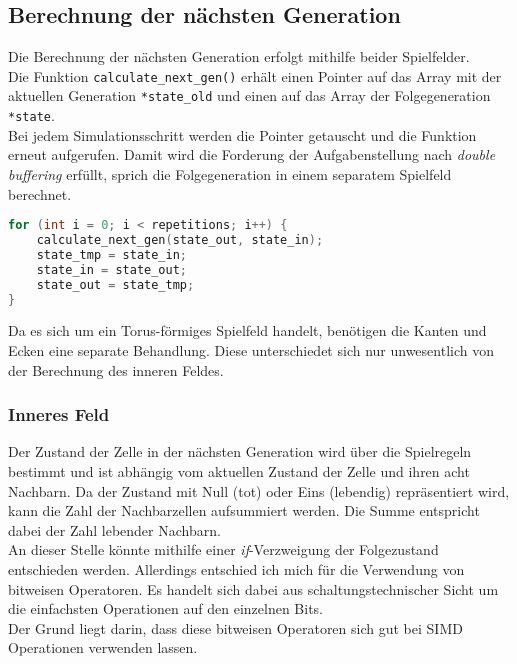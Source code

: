 \documentclass[german,plainarticle,hyperref,utf8]{zihpub}
\begin{document}
	\subsection{Berechnung der nächsten Generation}
	Die Berechnung der nächsten Generation erfolgt mithilfe beider Spielfelder.\\ Die Funktion \texttt{calculate\_next\_gen()} erhält einen Pointer auf das Array mit der aktuellen Generation \texttt{*state\_old} und einen auf das Array der Folgegeneration \texttt{*state}.\\
	Bei jedem Simulationsschritt werden die Pointer getauscht und die Funktion erneut aufgerufen. Damit wird die Forderung der Aufgabenstellung nach \textit{double buffering} erfüllt, sprich die Folgegeneration in einem separatem Spielfeld berechnet.
	\begin{lstlisting}[language=C, caption=Vertauschen der Pointer vor jedem Funktionsaufruf (vereinfacht)]
for (int i = 0; i < repetitions; i++) {
	calculate_next_gen(state_out, state_in);
	state_tmp = state_in;
	state_in = state_out;
	state_out = state_tmp;
}\end{lstlisting}
	Da es sich um ein Torus-förmiges Spielfeld handelt, benötigen die Kanten und Ecken eine separate Behandlung. Diese unterschiedet sich nur unwesentlich von der Berechnung des inneren Feldes.
	
	\subsubsection{Inneres Feld}
	Der Zustand der Zelle in der nächsten Generation wird über die Spielregeln bestimmt und ist abhängig vom aktuellen Zustand der Zelle und ihren acht Nachbarn. Da der Zustand mit Null (tot) oder Eins (lebendig) repräsentiert wird, kann die Zahl der Nachbarzellen aufsummiert werden. Die Summe entspricht dabei der Zahl lebender Nachbarn.\\
	An dieser Stelle könnte mithilfe einer \textit{if}-Verzweigung der Folgezustand entschieden werden. Allerdings entschied ich mich für die Verwendung von bitweisen Operatoren. Es handelt sich dabei aus schaltungstechnischer Sicht um die einfachsten Operationen auf den einzelnen Bits.\\
	Der Grund liegt darin, dass diese bitweisen Operatoren sich gut bei SIMD Operationen verwenden lassen.\\
	
\end{document}
